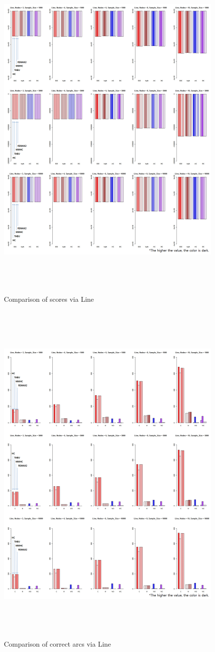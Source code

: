 	\begin{figure}[p]
	\centering
		\includegraphics[height=500pt]{images/02_Line_Score}
		\caption{Comparison of scores via Line}
	\end{figure}	

	\begin{figure}[p]
	\centering
		\includegraphics[height=500pt]{images/02_Line_Arcs}
		\caption{Comparison of correct arcs via Line}
	\end{figure}	
